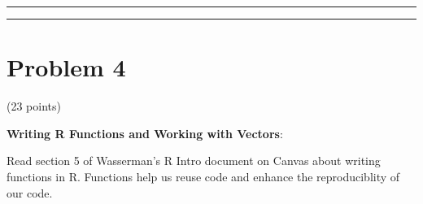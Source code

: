 \documentclass[]{article}
\begin{document}
\begin{center}\rule{0.5\linewidth}{\linethickness}\end{center}

\begin{center}\rule{0.5\linewidth}{\linethickness}\end{center}

\hypertarget{problem-4}{%
\section{Problem 4}\label{problem-4}}

(23 points)

\textbf{Writing R Functions and Working with Vectors}:

Read section 5 of Wasserman's R Intro document on Canvas about writing
functions in R. Functions help us reuse code and enhance the
reproduciblity of our code.
\end{document}
